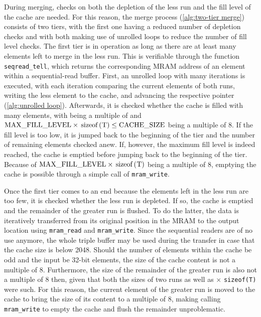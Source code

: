 During merging, checks on both the depletion of the less run and the fill level of the cache are needed.
For this reason, the merge process (\cref{alg:two-tier merge}) consists of two tiers, with the first one having a reduced number of depletion checks and with both making use of unrolled loops to reduce the number of fill level checks.
The first tier is in operation as long as there are at least \unrollfactor{} many elements left to merge in the less run.
This is verifiable through the function \lstinline|seqread_tell|, which returns the corresponding MRAM address of an element within a sequential-read buffer.
First, an unrolled loop with \unrollfactor{} many iterations is executed, with each iteration comparing the current elements of both runs, writing the less element to the cache, and advancing the respective pointer (\cref{alg:unrolled loop}).
Afterwards, it is checked whether the cache is filled with \unrolledcachelength{} many elements, with \unrolledcachelength{} being a multiple of \unrollfactor{} and \(\unrolledcachelength{} \times \text{\lstinline[keywords={}]|sizeof(T)|} \le \text{\lstinline|CACHE_SIZE|}\) being a multiple of 8.
If the fill level is too low, it is jumped back to the beginning of the tier and the number of remaining elements checked anew.
If, however, the maximum fill level is indeed reached, the cache is emptied before jumping back to the beginning of the tier.
Because of \(\unrolledcachelength{} \times \text{\lstinline[keywords={}]|sizeof(T)|}\) being a multiple of 8, emptying the cache is possible through a simple call of \lstinline|mram_write|.

Once the first tier comes to an end because the elements left in the less run are too few, it is checked whether the less run is depleted.
If so, the cache is emptied and the remainder of the greater run is flushed.
To do the latter, the data is iteratively transferred from its original position in the MRAM to the output location using \lstinline|mram_read| and \lstinline|mram_write|.
Since the sequential readers are of no use anymore, the whole triple buffer may be used during the transfer in case that the cache size is below \qty{2048}{\byte}.
Should the number of elements within the cache be odd and the input be 32-bit elements, the size of the cache content is not a multiple of 8.
Furthermore, the size of the remainder of the greater run is also not a multiple of 8 then, given that both the sizes of two runs as well as \unrolledcachelength{} × \lstinline[keywords={}]|sizeof(T)| were such.
For this reason, the current element of the greater run is moved to the cache to bring the size of its content to a multiple of 8, making calling \lstinline|mram_write| to empty the cache and flush the remainder unproblematic.

